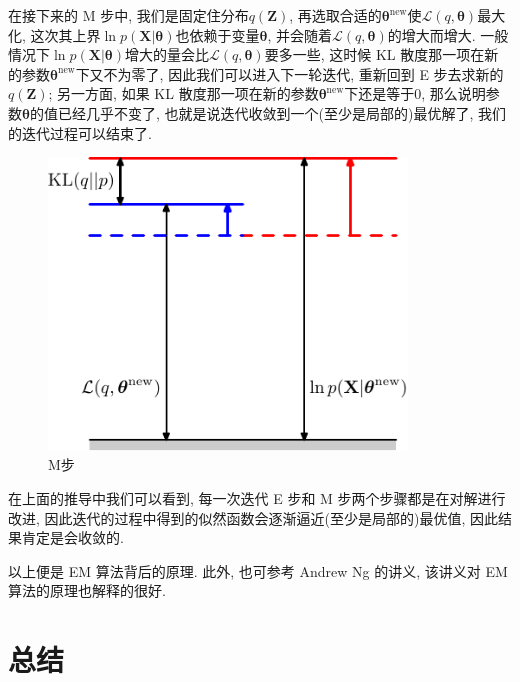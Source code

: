 \documentclass[a4paper,UTF8]{ctexart}
\theoremstyle{plain} \newtheorem{theorem}{定理}[section]
\theoremstyle{plain} \newtheorem{definition}{定义}[section]
\theoremstyle{plain} \newtheorem{lemma}{引理}[section]
\theoremstyle{plain} \newtheorem{proposition}{命题}[section]
\theoremstyle{plain} \newtheorem{example}{例}
\theoremstyle{plain} \newtheorem{remark}{注}
\theoremstyle{plain} \newtheorem{corollary}{推论}[section]
\begin{document}
在接下来的 M 步中, 我们是固定住分布$q(\bm{Z})$, 再选取合适的$\bm{\theta}^{\mathrm{new}}$使$\mathcal{L}(q, \bm{\theta})$最大化, 这次其上界$\ln p(\bm{X} | \bm{\theta})$也依赖于变量$\bm{\theta}$, 并会随着$\mathcal{L}(q, \bm{\theta})$的增大而增大. 一般情况下$\ln p(\bm{X} | \bm{\theta})$增大的量会比$\mathcal{L}(q, \bm{\theta})$要多一些, 这时候 KL 散度那一项在新的参数$\bm{\theta}^{\mathrm{new}}$下又不为零了, 因此我们可以进入下一轮迭代, 重新回到 E 步去求新的$q(\bm{Z})$; 另一方面, 如果 KL 散度那一项在新的参数$\bm{\theta}^{\mathrm{new}}$下还是等于$0$, 那么说明参数$\bm{\theta}$的值已经几乎不变了, 也就是说迭代收敛到一个(至少是局部的)最优解了, 我们的迭代过程可以结束了.
\begin{figure}[!htb]
	\centering
	\includegraphics[width=0.85\textwidth]{kld3.pdf}
	\caption{M步}
	\label{kld3}
\end{figure}

在上面的推导中我们可以看到, 每一次迭代 E 步和 M 步两个步骤都是在对解进行改进, 因此迭代的过程中得到的似然函数会逐渐逼近(至少是局部的)最优值, 因此结果肯定是会收敛的.

以上便是 EM 算法背后的原理. 此外, 也可参考 Andrew Ng 的讲义, 该讲义对 EM 算法的原理也解释的很好.






\section{总结}
\end{document}
